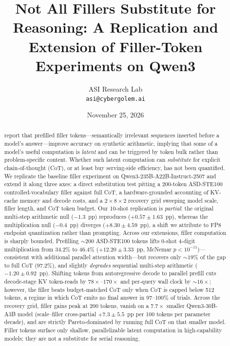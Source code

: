 \documentclass[11pt,a4paper]{article}
\title{Not All Fillers Substitute for Reasoning: A Replication and Extension of
Filler-Token Experiments on Qwen3}
\author{ASI Research Lab\\
        \texttt{asi@cybergolem.ai}}
\date{November 25, 2026}
\begin{document}
\maketitle

\begin{abstract}
\citet{baherwani2026not} report that prefilled filler tokens---semantically
irrelevant sequences inserted before a model's answer---improve accuracy on
synthetic arithmetic, implying that some of a model's useful computation is
\emph{latent} and can be triggered by token bulk rather than problem-specific
content. Whether such latent computation can \emph{substitute} for explicit
chain-of-thought (CoT), or at least buy serving-side efficiency, has not been
quantified. We replicate the baseline filler experiment on
Qwen3-235B-A22B-Instruct-2507 and extend it along three axes: a direct
substitution test pitting a 200-token ASD-STE100 controlled-vocabulary filler
against full CoT, a hardware-grounded accounting of KV-cache memory and decode
costs, and a $2\times8\times2$ recovery grid sweeping model scale, filler length,
and CoT token budget. Our 10-shot replication is \emph{partial}: the original
multi-step arithmetic null ($-1.3$~pp) reproduces ($+0.57 \pm 1.63$~pp), whereas
the multiplication null ($-0.4$~pp) diverges ($+8.30 \pm 4.59$~pp), a shift we
attribute to FP8 endpoint quantization rather than prompting. Across our
extensions, filler computation is sharply bounded. Prefilling ${\sim}200$
ASD-STE100 tokens lifts 0-shot 4-digit multiplication from 34.2\% to 46.4\%
($+12.20 \pm 3.33$~pp, McNemar $p<10^{-11}$)---consistent with additional
parallel attention width---but recovers only ${\sim}19\%$ of the gap to full CoT
(97.2\%), and slightly \emph{degrades} sequential multi-step arithmetic
($-1.20 \pm 0.92$~pp). Shifting tokens from autoregressive decode to parallel
prefill cuts decode-stage KV token-reads by $78\times$--$170\times$ and
per-query wall clock by ${\sim}16\times$; however, the filler beats
budget-matched CoT only when CoT is capped below 512 tokens, a regime in which
CoT emits no final answer in 97--100\% of trials. Across the recovery grid,
filler gains peak at 200 tokens, vanish on a $7.7\times$ smaller Qwen3-30B-A3B
model (scale--filler cross-partial $+7.3 \pm 5.5$~pp per 100 tokens per parameter
decade), and are strictly Pareto-dominated by running full CoT on that smaller
model. Filler tokens surface only shallow, parallelizable latent computation in
high-capability models; they are not a substitute for serial reasoning.
\end{abstract}
\end{document}
